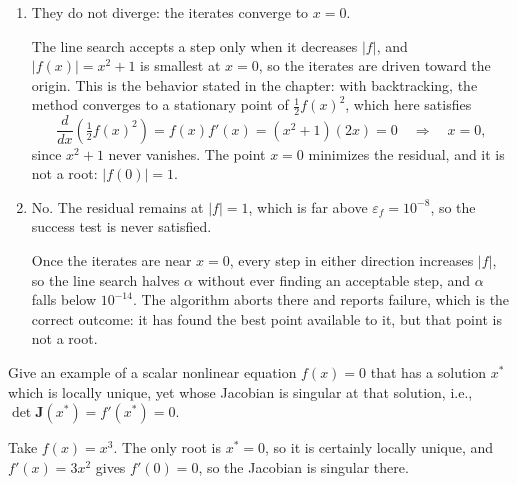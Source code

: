 \begin{solution}
    
    \begin{enumerate}[label=(\alph*)]
        \item They do not diverge: the iterates converge to $x = 0$.

        The line search accepts a step only when it decreases $|f|$, and $|f(x)| = x^2 + 1$ is smallest at $x = 0$, so the iterates are driven toward the origin. This is the behavior stated in the chapter: with backtracking, the method converges to a stationary point of $\tfrac{1}{2}f(x)^2$, which here satisfies
        \[
            \frac{d}{dx}\left(\tfrac{1}{2}f(x)^2\right) = f(x) f'(x) = (x^2+1)(2x) = 0
            \quad \Longrightarrow \quad x = 0 ,
        \]
        since $x^2 + 1$ never vanishes. The point $x = 0$ minimizes the residual, and it is not a root: $|f(0)| = 1$.
        \item No. The residual remains at $|f| = 1$, which is far above $\varepsilon_f = 10^{-8}$, so the success test is never satisfied.

        Once the iterates are near $x = 0$, every step in either direction increases $|f|$, so the line search halves $\alpha$ without ever finding an acceptable step, and $\alpha$ falls below $10^{-14}$. The algorithm aborts there and reports failure, which is the correct outcome: it has found the best point available to it, but that point is not a root.

    \end{enumerate}

    
\end{solution}

\begin{exercise} %
    
    Give an example of a scalar nonlinear equation $f(x) = 0$ that has a solution $x^*$ which is locally unique, yet whose Jacobian is singular at that solution, i.e., $\det \mathbf{J}(x^*) = f'(x^*) = 0$.
    
\end{exercise}

\begin{solution}
    
    Take $f(x) = x^3$. The only root is $x^* = 0$, so it is certainly locally unique, and $f'(x) = 3x^2$ gives $f'(0) = 0$, so the Jacobian is singular there.
    
\end{solution}


